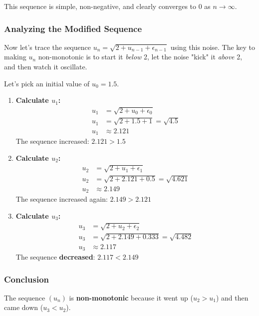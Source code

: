 \documentclass[12pt,a4paper]{article}
\theoremstyle{definition}
\begin{document}
This sequence is simple, non-negative, and clearly converges to 0 as $n \to \infty$.

\subsubsection{Analyzing the Modified Sequence}

Now let's trace the sequence $u_n = \sqrt{2 + u_{n-1} + \epsilon_{n-1}}$ using this noise. The key to making $u_n$ non-monotonic is to start it \textit{below} 2, let the noise "kick" it \textit{above} 2, and then watch it oscillate.

Let's pick an initial value of \textbf{$u_0 = 1.5$}.

\begin{enumerate}
    \item \textbf{Calculate $u_1$:}
    \begin{align*}
    u_1 &= \sqrt{2 + u_0 + \epsilon_0}\\
    u_1 &= \sqrt{2 + 1.5 + 1} = \sqrt{4.5}\\
    u_1 &\approx 2.121
    \end{align*}
    The sequence increased: $2.121 > 1.5$
    
    \item \textbf{Calculate $u_2$:}
    \begin{align*}
    u_2 &= \sqrt{2 + u_1 + \epsilon_1}\\
    u_2 &= \sqrt{2 + 2.121 + 0.5} = \sqrt{4.621}\\
    u_2 &\approx 2.149
    \end{align*}
    The sequence increased again: $2.149 > 2.121$
    
    \item \textbf{Calculate $u_3$:}
    \begin{align*}
    u_3 &= \sqrt{2 + u_2 + \epsilon_2}\\
    u_3 &= \sqrt{2 + 2.149 + 0.333} = \sqrt{4.482}\\
    u_3 &\approx 2.117
    \end{align*}
    The sequence \textbf{decreased}: $2.117 < 2.149$
\end{enumerate}

\subsubsection{Conclusion}

The sequence $(u_n)$ is \textbf{non-monotonic} because it went up ($u_2 > u_1$) and then came down ($u_3 < u_2$).
\end{document}
